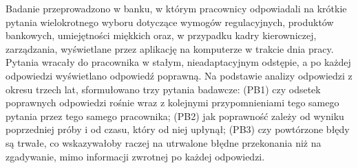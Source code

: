 Badanie przeprowadzono w banku, w którym pracownicy odpowiadali na krótkie pytania wielokrotnego
wyboru dotyczące wymogów regulacyjnych, produktów bankowych, umiejętności miękkich oraz, w przypadku
kadry kierowniczej, zarządzania, wyświetlane przez aplikację na komputerze w trakcie dnia pracy.
Pytania wracały do pracownika w stałym, nieadaptacyjnym odstępie, a po każdej odpowiedzi wyświetlano
odpowiedź poprawną. Na podstawie analizy odpowiedzi z okresu trzech lat,  sformułowano trzy pytania badawcze:
(PB1) czy odsetek poprawnych odpowiedzi rośnie wraz z kolejnymi przypomnieniami tego samego pytania
przez tego samego pracownika;
(PB2) jak poprawność zależy od wyniku poprzedniej próby i od czasu, który od niej upłynął;
(PB3) czy powtórzone błędy są trwałe, co wskazywałoby raczej na utrwalone błędne przekonania niż na
zgadywanie, mimo informacji zwrotnej po każdej odpowiedzi.
